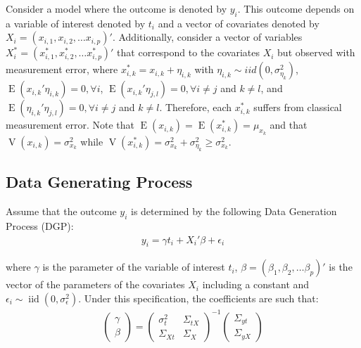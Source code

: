 \documentclass[12pt]{article}
\def\b{\beta}
\def\g{\gamma}
\begin{document}
        Consider a model where the outcome is denoted by $y_i$. This outcome depends on a variable of interest denoted by $t_i$ and a vector of covariates denoted by $X_i=(x_{i,1},x_{i,2},\dots x_{i,p})'$. Additionally, consider a vector of variables $X^*_i=(x^*_{i,1},x^*_{i,2},\dots x^*_{i,p})'$ that correspond to the covariates $X_i$ but observed with measurement error, where $x^*_{i,k}=x_{i,k}+\eta_{i,k}$ with $\eta_{i,k} \sim {iid}(0,\sigma^2_{\eta_k})$, $\operatorname{E}(x_{i,k}'\eta_{i,k})=0, \forall i$, $\operatorname{E}(x_{i,k}'\eta_{j,l})=0, \forall i\neq j$ and $k \neq l$, and $\operatorname{E}(\eta_{i,k}'\eta_{j,l})=0, \forall i\neq j$ and $k \neq l$. Therefore, each $x^*_{i,k}$ suffers from classical measurement error. Note that $\operatorname{E}(x_{i,k})=\operatorname{E}(x^*_{i,k})=\mu_{x_k}$ and that $\operatorname{V}(x_{i,k})=\sigma^2_{x_k}$ while $\operatorname{V}(x^*_{i,k})=\sigma^2_{x_k}+\sigma^2_{\eta_k}\geq \sigma^2_{x_k}$.

    \subsection*{Data Generating Process}

        Assume that the outcome $y_i$ is determined by the following Data Generation Process (DGP):
        \begin{align}
            y_i = \gamma t_i + X_i'\beta + \epsilon_i
        \end{align}

        where $\g$ is the parameter of the variable of interest $t_i$, $\b=(\b_1,\b_2,\dots \b_p)'$ is the vector of the parameters of the covariates $X_i$ including a constant and $\epsilon_i \sim \operatorname{iid}(0,\sigma^2_\epsilon)$. Under this specification, the coefficients are such that:
        \begin{align}
            \left(\begin{array}{l}
        {\gamma} \\
        {\beta}
        \end{array}\right)=\left(\begin{array}{cc}
        {\sigma}^2_{t} & \Sigma_{tX} \\
        \Sigma_{Xt} & {\Sigma}_{X}
        \end{array}\right)^{-1}\left(\begin{array}{c}
        \Sigma_{yt} \\
        \Sigma_{yX}
        \end{array}\right)
        \end{align}
\end{document}
